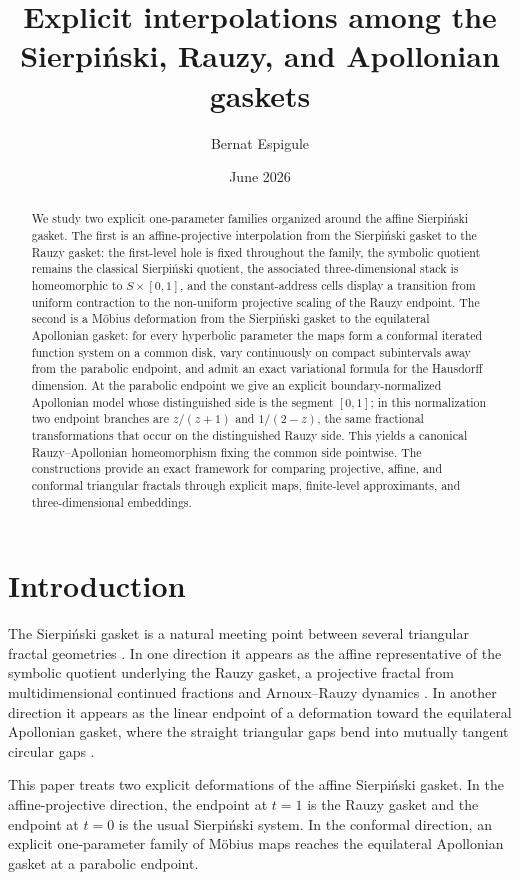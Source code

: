 \documentclass[11pt]{amsart}
\title[Explicit gasket interpolations]{Explicit interpolations among the Sierpi\'nski, Rauzy, and Apollonian gaskets}
\author{Bernat Espigule}
\date{June 2026}
\theoremstyle{definition}
\begin{document}
\begin{abstract}
We study two explicit one-parameter families organized around the affine Sierpi\'nski gasket. The first is an affine-projective interpolation from the Sierpi\'nski gasket to the Rauzy gasket: the first-level hole is fixed throughout the family, the symbolic quotient remains the classical Sierpi\'nski quotient, the associated three-dimensional stack is homeomorphic to $S\times[0,1]$, and the constant-address cells display a transition from uniform contraction to the non-uniform projective scaling of the Rauzy endpoint. The second is a M\"obius deformation from the Sierpi\'nski gasket to the equilateral Apollonian gasket: for every hyperbolic parameter the maps form a conformal iterated function system on a common disk, vary continuously on compact subintervals away from the parabolic endpoint, and admit an exact variational formula for the Hausdorff dimension. At the parabolic endpoint we give an explicit boundary-normalized Apollonian model whose distinguished side is the segment $[0,1]$; in this normalization two endpoint branches are $z/(z+1)$ and $1/(2-z)$, the same fractional transformations that occur on the distinguished Rauzy side. This yields a canonical Rauzy--Apollonian homeomorphism fixing the common side pointwise. The constructions provide an exact framework for comparing projective, affine, and conformal triangular fractals through explicit maps, finite-level approximants, and three-dimensional embeddings.
\end{abstract}
\maketitle

\section{Introduction}
The Sierpi\'nski gasket is a natural meeting point between several triangular fractal geometries \cite{Sierpinski1915,Hutchinson1981}. In one direction it appears as the affine representative of the symbolic quotient underlying the Rauzy gasket, a projective fractal from multidimensional continued fractions and Arnoux--Rauzy dynamics \cite{ArnouxStarosta2013,Jurga2026}. In another direction it appears as the linear endpoint of a deformation toward the equilateral Apollonian gasket, where the straight triangular gaps bend into mutually tangent circular gaps \cite{McMullen1998,VytnovaWormell2025}.

This paper treats two explicit deformations of the affine Sierpi\'nski gasket. In the affine-projective direction, the endpoint at $t=1$ is the Rauzy gasket and the endpoint at $t=0$ is the usual Sierpi\'nski system. In the conformal direction, an explicit one-parameter family of M\"obius maps reaches the equilateral Apollonian gasket at a parabolic endpoint.
\end{document}
